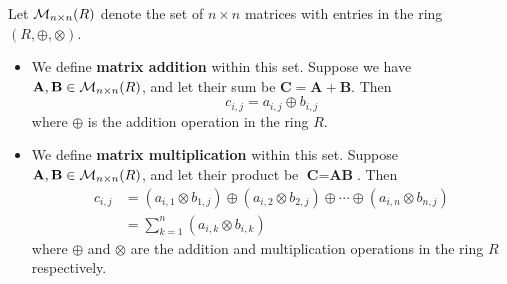 Let $\mathcal{M}_{n\times n}(R)$ denote the set of $n\times n$ matrices with entries in the ring $(R, \oplus, \otimes)$.
\begin{itemize}
    \item We define \textbf{matrix addition} within this set. Suppose we have $\textbf{A}, \textbf{B} \in \mathcal{M}_{n\times n}(R)$, and let their sum be $\textbf{C} = \textbf{A} + \textbf{B}$. Then
    \[
        c_{i,j} = a_{i,j} \oplus b_{i,j}    
    \]
    where $\oplus$ is the addition operation in the ring $R$.
    
    \item We define \textbf{matrix multiplication} within this set. Suppose $\textbf{A}, \textbf{B} \in \mathcal{M}_{n\times n}(R)$, and let their product be $\textbf{C} = \textbf{AB}$. Then
    \begin{align*}
        c_{i,j} &= (a_{i,1}\otimes b_{1,j}) \oplus (a_{i,2}\otimes b_{2,j}) \oplus \cdots \oplus (a_{i,n}\otimes b_{n,j})\\
        &= \sum_{k=1}^n (a_{i,k}\otimes b_{i,k})
    \end{align*}
    where $\oplus$ and $\otimes$ are the addition and multiplication operations in the ring $R$ respectively.
\end{itemize}

